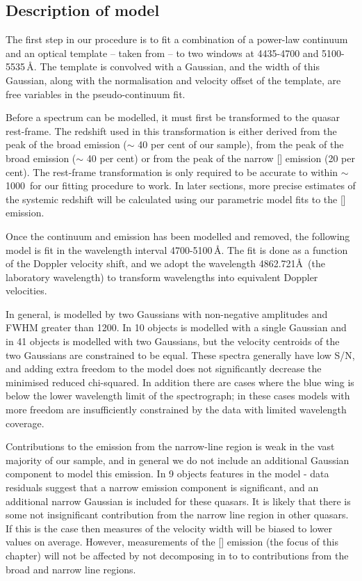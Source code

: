 \subsection{Description of model}

The first step in our procedure is to fit a combination of a power-law continuum and an optical  template -- taken from \citet{boroson92} -- to two windows at 4435-4700 and 5100-5535\,\AA.
The  template is convolved with a Gaussian, and the width of this Gaussian, along with the normalisation and velocity offset of the  template, are free variables in the pseudo-continuum fit.

Before a spectrum can be modelled, it must first be transformed to the quasar rest-frame.  
The redshift used in this transformation is either derived from the peak of the broad \ha emission ($\sim$ 40 per cent of our sample), from the peak of the broad \hb emission ($\sim$ 40 per cent) or from the peak of the narrow [] emission (20 per cent).
The rest-frame transformation is only required to be accurate to within $\sim$1000\kms\, for our fitting procedure to work. 
In later sections, more precise estimates of the systemic redshift will be calculated using our parametric model fits to the [] emission. 

Once the continuum and  emission has been modelled and removed, the following model is fit in the wavelength interval 4700-5100\,\AA.
The fit is done as a function of the Doppler velocity shift, and we adopt the wavelength 4862.721\AA\, (the laboratory \hb wavelength) to transform wavelengths into equivalent Doppler velocities.

In general, \hb is modelled by two Gaussians with non-negative amplitudes and FWHM greater than 1200\kms.
In 10 objects \hb is modelled with a single Gaussian and in 41 objects \hb is modelled with two Gaussians, but the velocity centroids of the two Gaussians are constrained to be equal. 
These spectra generally have low \ac{S/N}, and adding extra freedom to the model does not significantly decrease the minimised reduced chi-squared.
In addition there are cases where the blue wing is below the lower wavelength limit of the spectrograph; in these cases models with more freedom are insufficiently constrained by the data with limited wavelength coverage. 

Contributions to the \hb emission from the narrow-line region is weak in the vast majority of our sample, and in general we do not include an additional Gaussian component to model this emission. 
In 9 objects features in the model - data residuals suggest that a narrow emission component is significant, and an additional narrow Gaussian is included for these quasars. 
It is likely that there is some not insignificant contribution from the narrow line region in other quasars. 
If this is the case then measures of the \hb velocity width will be biased to lower values on average. 
However, measurements of the [] emission (the focus of this chapter) will not be affected by not decomposing \hb in to to contributions from the broad and narrow line regions.  

